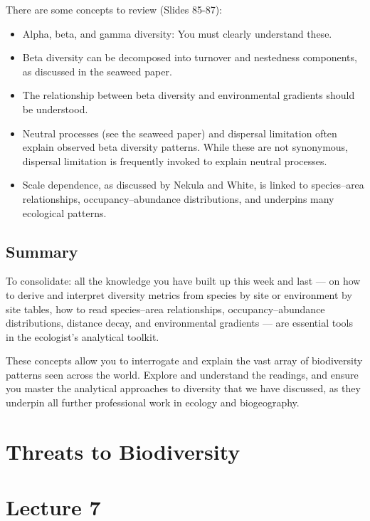 \documentclass[
  11pt,
]{book}
\providecommand{\tightlist}{%
  \setlength{\itemsep}{0pt}\setlength{\parskip}{0pt}}
\begin{document}
There are some concepts to review (Slides 85-87):

\begin{itemize}
\tightlist
\item
  Alpha, beta, and gamma diversity: You must clearly understand these.
\item
  Beta diversity can be decomposed into turnover and nestedness
  components, as discussed in the seaweed paper.
\item
  The relationship between beta diversity and environmental gradients
  should be understood.
\item
  Neutral processes (see the seaweed paper) and dispersal limitation
  often explain observed beta diversity patterns. While these are not
  synonymous, dispersal limitation is frequently invoked to explain
  neutral processes.
\item
  Scale dependence, as discussed by Nekula and White, is linked to
  species--area relationships, occupancy--abundance distributions, and
  underpins many ecological patterns.
\end{itemize}

\section{Summary}\label{summary}

To consolidate: all the knowledge you have built up this week and last
--- on how to derive and interpret diversity metrics from species by
site or environment by site tables, how to read species--area
relationships, occupancy--abundance distributions, distance decay, and
environmental gradients --- are essential tools in the ecologist's
analytical toolkit.

These concepts allow you to interrogate and explain the vast array of
biodiversity patterns seen across the world. Explore and understand the
readings, and ensure you master the analytical approaches to diversity
that we have discussed, as they underpin all further professional work
in ecology and biogeography.

\chapter{Threats to Biodiversity}\label{threats-to-biodiversity}

\chapter*{Lecture 7}\label{lecture-7}
\end{document}
